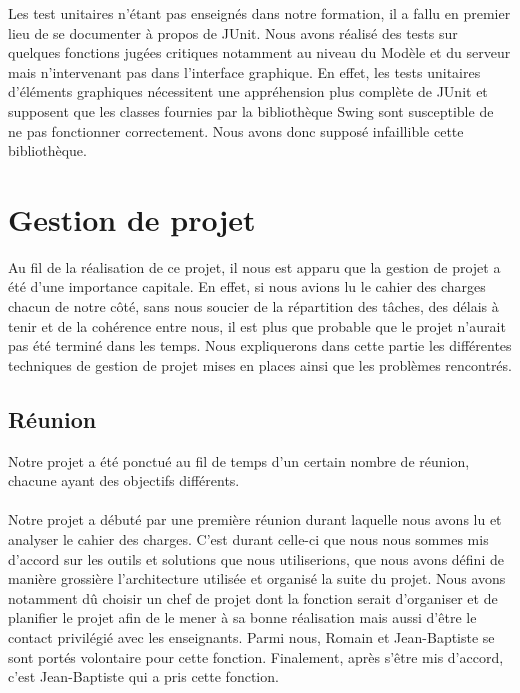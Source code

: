 \documentclass[a4paper,11pt]{article}
\begin{document}
Les test unitaires n'\'etant pas enseign\'es dans notre formation, il a fallu en premier lieu de se documenter \`a propos de JUnit. Nous avons r\'ealis\'e des tests sur quelques fonctions jugées critiques notamment au niveau du Modèle et du serveur mais n'intervenant pas dans l'interface graphique. En effet, les tests unitaires d'\'el\'ements graphiques n\'ecessitent une appr\'ehension plus compl\`ete de JUnit et supposent que les classes fournies par la biblioth\`eque Swing sont susceptible de ne pas fonctionner correctement. Nous avons donc suppos\'e infaillible cette biblioth\`eque.

\section{Gestion de projet}
Au fil de la réalisation de ce projet, il nous est apparu que la gestion de projet a été d'une importance capitale. En effet, si nous avions lu le cahier des charges chacun de notre côté, sans nous soucier de la répartition des tâches, des délais à tenir et de la cohérence entre nous, il est plus que probable que le projet n'aurait pas été terminé dans les temps. Nous expliquerons dans cette partie les différentes techniques de gestion de projet mises en places ainsi que les problèmes rencontrés.

\subsection{Réunion}
Notre projet a été ponctué au fil de temps d'un certain nombre de réunion, chacune ayant des objectifs différents.

\paragraph{} Notre projet a débuté par une première réunion durant laquelle nous avons lu et analyser le cahier des charges. C'est durant celle-ci que nous nous sommes mis d'accord sur les outils et solutions que nous utiliserions, que nous avons défini de manière grossière l'architecture utilisée et organisé la suite du projet. Nous avons notamment dû choisir un chef de projet dont la fonction serait d'organiser et de planifier le projet afin de le mener à sa bonne réalisation mais aussi d'être le contact privilégié avec les enseignants. Parmi nous, Romain et Jean-Baptiste se sont portés volontaire pour cette fonction. Finalement, après s'être mis d'accord, c'est Jean-Baptiste qui a pris cette fonction.
\end{document}
